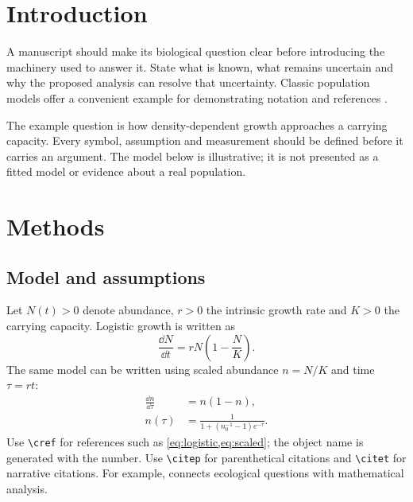 \section{Introduction}\label{sec:introduction}
A manuscript should make its biological question clear before introducing the machinery used to answer it. State what is known, what remains uncertain and why the proposed analysis can resolve that uncertainty. Classic population models offer a convenient example for demonstrating notation and references \citep{lotka1925,may1972}.

The example question is how density-dependent growth approaches a carrying capacity. Every symbol, assumption and measurement should be defined before it carries an argument. The model below is illustrative; it is not presented as a fitted model or evidence about a real population.

\section{Methods}\label{sec:methods}
\subsection{Model and assumptions}
Let $N(t)>0$ denote abundance, $r>0$ the intrinsic growth rate and $K>0$ the carrying capacity. Logistic growth is written as
\begin{equation}\label{eq:logistic}
  \frac{\dd N}{\dd t}=rN\left(1-\frac{N}{K}\right).
\end{equation}
The same model can be written using scaled abundance $n=N/K$ and time $\tau=rt$:
\begin{align}
  \frac{\dd n}{\dd\tau} &= n(1-n),\label{eq:scaled}\\
  n(\tau) &= \frac{1}{1+(n_0^{-1}-1)e^{-\tau}}.\label{eq:solution}
\end{align}
Use \texttt{\textbackslash cref} for references such as \cref{eq:logistic,eq:scaled}; the object name is generated with the number. Use \texttt{\textbackslash citep} for parenthetical citations and \texttt{\textbackslash citet} for narrative citations. For example, \citet{may1972} connects ecological questions with mathematical analysis.

